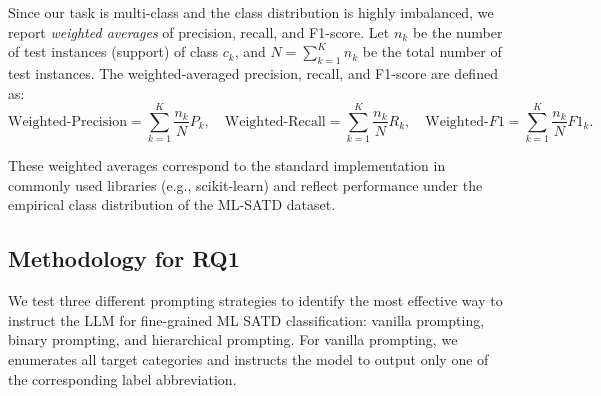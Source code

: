 \documentclass[acmsmall,screen,review,anonymous]{acmart}
\begin{document}
Since our task is multi-class and the class distribution is highly imbalanced, we report \emph{weighted averages} of precision, recall, and F1-score. Let $n_k$ be the number of test instances (support) of class $c_k$, and $N = \sum_{k=1}^{K} n_k$ be the total number of test instances. The weighted-averaged precision, recall, and F1-score are defined as:
\begin{equation}
  \text{Weighted-Precision} = \sum_{k=1}^{K} \frac{n_k}{N} P_k, \quad
  \text{Weighted-Recall}    = \sum_{k=1}^{K} \frac{n_k}{N} R_k, \quad
  \text{Weighted-}F1        = \sum_{k=1}^{K} \frac{n_k}{N} F1_k.
\end{equation}

These weighted averages correspond to the standard implementation in commonly used libraries (e.g., scikit-learn) and reflect performance under the empirical class distribution of the ML-SATD dataset.








\subsection{Methodology for RQ1}

We test three different prompting strategies to identify the most effective way to instruct the LLM for fine-grained ML SATD classification: vanilla prompting, binary prompting, and hierarchical prompting. For vanilla prompting, we enumerates all target categories and instructs the model to output only one of the corresponding label abbreviation. 
\end{document}
